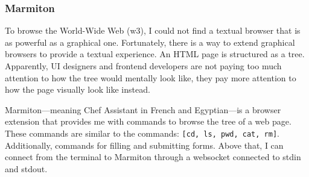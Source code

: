 \subsubsection{
Marmiton
}
To browse the World-Wide Web (w3), I could not find a textual browser that is as 
powerful as a graphical one.
Fortunately, there is a way to extend graphical browsers to provide a textual 
experience.
An HTML page is structured as a tree.
Apparently, UI designers and frontend developers are not paying too much 
attention to how the tree would mentally look like, they pay more attention to 
how the page visually look like instead.

Marmiton---meaning Chef Assistant in French and Egyptian---is a browser 
extension that provides me with commands to browse the tree of a web page.
These commands are similar to the commands: \texttt{[cd, ls, pwd, cat, rm]}.
Additionally, commands for filling and submitting forms.
Above that, I can connect from the terminal to Marmiton through a websocket 
connected to stdin and stdout.
